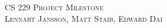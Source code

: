 \documentclass[11pt]{article}
\begin{document}
 
\begin{center}
	\textsc{\Large CS 229 Project Milestone} \\
	\textsc{Lennart Jansson, Matt Staib, Edward Dai}
\end{center}
\end{document}
